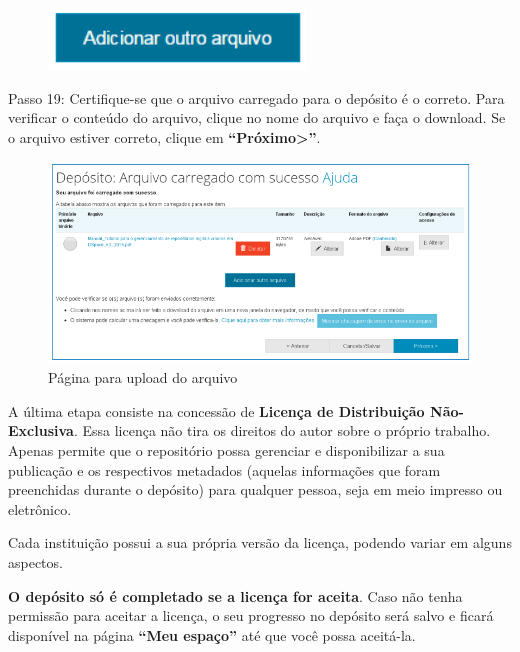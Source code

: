 \documentclass[12pt,hidelinks]{article}
\begin{document}
    \begin{figure}[!htp]
                \centering
                \includegraphics[scale=0.7]{figura/AdicionarOutroArquivo.png}
            \label{Rotulo}
        \end{figure}
    
    Passo 19: Certifique-se que o arquivo carregado para o depósito é o correto. Para verificar o conteúdo do arquivo, clique no nome do arquivo e faça o download. Se o arquivo estiver correto, clique em \textbf{“Próximo>”}.
    
    \begin{figure}[!htp]
                \centering
                \includegraphics[scale=0.8]{figura/Figura159.png}
                \caption{Página para upload do arquivo}
            \label{Rotulo}
        \end{figure}
    
    A última etapa consiste na concessão de \textbf{Licença de Distribuição Não-Exclusiva}. Essa licença não tira os direitos do autor sobre o próprio trabalho. Apenas permite que o repositório possa gerenciar e disponibilizar a sua publicação e os respectivos metadados (aquelas informações que foram preenchidas durante o depósito) para qualquer pessoa, seja em meio impresso ou eletrônico.
    
    \singlespacing
    
    Cada instituição possui a sua própria versão da licença, podendo variar em alguns aspectos.
    
    \singlespacing
    
    \textbf{O depósito só é completado se a licença for aceita}. Caso não tenha permissão para aceitar a licença, o seu progresso no depósito será salvo e ficará disponível na página \textbf{“Meu espaço”} até que você possa aceitá-la.
    
\end{document}
